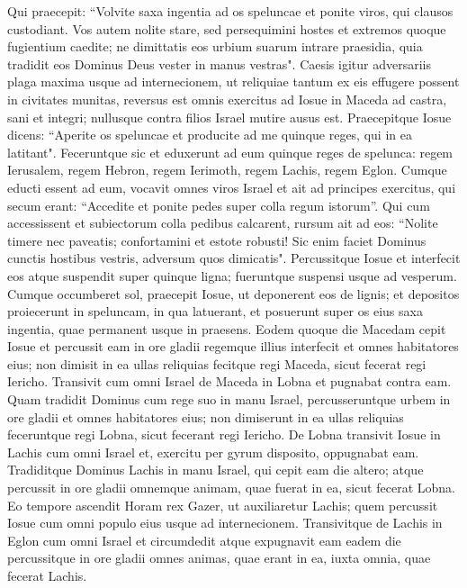 \begin{biblechapter}
\verse Qui praecepit: “Volvite saxa ingentia ad os speluncae et ponite viros, qui clausos custodiant. 
\verse Vos autem nolite stare, sed persequimini hostes et extremos quoque fugientium caedite; ne dimittatis eos urbium suarum intrare praesidia, quia tradidit eos Dominus Deus vester in manus vestras". 
\verse Caesis igitur adversariis plaga maxima usque ad internecionem, ut reliquiae tantum ex eis effugere possent in civitates munitas, 
\verse reversus est omnis exercitus ad Iosue in Maceda ad castra, sani et integri; nullusque contra filios Israel mutire ausus est. 
\verse Praecepitque Iosue dicens: “Aperite os speluncae et producite ad me quinque reges, qui in ea latitant". 
\verse Feceruntque sic et eduxerunt ad eum quinque reges de spelunca: regem Ierusalem, regem Hebron, regem Ierimoth, regem Lachis, regem Eglon. 
\verse Cumque educti essent ad eum, vocavit omnes viros Israel et ait ad principes exercitus, qui secum erant: “Accedite et ponite pedes super colla regum istorum”. Qui cum accessissent et subiectorum colla pedibus calcarent, 
\verse rursum ait ad eos: “Nolite timere nec paveatis; confortamini et estote robusti! Sic enim faciet Dominus cunctis hostibus vestris, adversum quos dimicatis". 
\verse Percussitque Iosue et interfecit eos atque suspendit super quinque ligna; fueruntque suspensi usque ad vesperum. 
\verse Cumque occumberet sol, praecepit Iosue, ut deponerent eos de lignis; et depositos proiecerunt in speluncam, in qua latuerant, et posuerunt super os eius saxa ingentia, quae permanent usque in praesens. 
\verse Eodem quoque die Macedam cepit Iosue et percussit eam in ore gladii regemque illius interfecit et omnes habitatores eius; non dimisit in ea ullas reliquias fecitque regi Maceda, sicut fecerat regi Iericho. 
\verse Transivit cum omni Israel de Maceda in Lobna et pugnabat contra eam. 
\verse Quam tradidit Dominus cum rege suo in manu Israel, percusseruntque urbem in ore gladii et omnes habitatores eius; non dimiserunt in ea ullas reliquias feceruntque regi Lobna, sicut fecerant regi Iericho. 
\verse De Lobna transivit Iosue in Lachis cum omni Israel et, exercitu per gyrum disposito, oppugnabat eam. 
\verse Tradiditque Dominus Lachis in manu Israel, qui cepit eam die altero; atque percussit in ore gladii omnemque animam, quae fuerat in ea, sicut fecerat Lobna. 
\verse Eo tempore ascendit Horam rex Gazer, ut auxiliaretur Lachis; quem percussit Iosue cum omni populo eius usque ad internecionem. 
\verse Transivitque de Lachis in Eglon cum omni Israel et circumdedit 
\verse atque expugnavit eam eadem die percussitque in ore gladii omnes animas, quae erant in ea, iuxta omnia, quae fecerat Lachis. 

\end{biblechapter}
